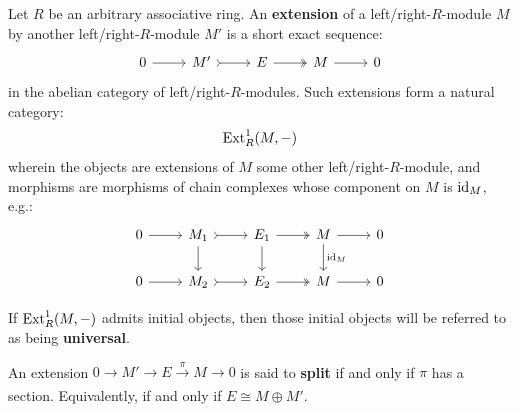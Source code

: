         \begin{definition}
            Let $R$ be an arbitrary associative ring. An \textbf{extension} of a left/right-$R$-module $M$ by another left/right-$R$-module $M'$ is a short exact sequence:
                $$
                    \begin{tikzcd}
                	0 & {M'} & E & M & 0
                	\arrow[from=1-1, to=1-2]
                	\arrow[tail, from=1-2, to=1-3]
                	\arrow[two heads, from=1-3, to=1-4]
                	\arrow[from=1-4, to=1-5]
                    \end{tikzcd}
                $$
            in the abelian category of left/right-$R$-modules. Such extensions form a natural category:
                $$\mathrm{Ext}_R^1(M, -)$$
            wherein the objects are extensions of $M$ some other left/right-$R$-module, and morphisms are morphisms of chain complexes whose component on $M$ is $\mathrm{id}_M$, e.g.:
                $$
                    \begin{tikzcd}
                	0 & {M_1} & {E_1} & M & 0 \\
                	0 & {M_2} & {E_2} & M & 0
                	\arrow[from=1-1, to=1-2]
                	\arrow[tail, from=1-2, to=1-3]
                	\arrow[two heads, from=1-3, to=1-4]
                	\arrow[from=1-4, to=1-5]
                	\arrow[from=2-1, to=2-2]
                	\arrow[tail, from=2-2, to=2-3]
                	\arrow[two heads, from=2-3, to=2-4]
                	\arrow[from=2-4, to=2-5]
                	\arrow["{}", from=1-2, to=2-2]
                	\arrow["{\id_M}", from=1-4, to=2-4]
                	\arrow[from=1-3, to=2-3]
                    \end{tikzcd}
                $$
                
            If $\mathrm{Ext}_R^1(M, -)$ admits initial objects, then those initial objects will be referred to as being \textbf{universal}. 

            An extension $0 \to M' \to E \xrightarrow[]{\pi} M \to 0$ is said to \textbf{split} if and only if $\pi$ has a section. Equivalently, if and only if $E \cong M \oplus M'$. 
        \end{definition}
